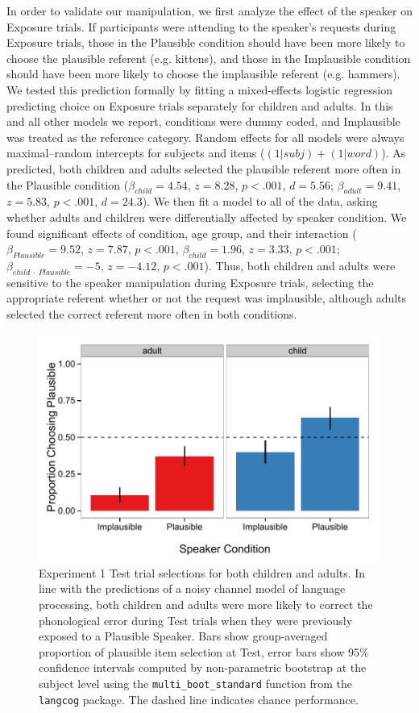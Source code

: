 \documentclass[man,floatsintext]{apa6}
\begin{document}
In order to validate our manipulation, we first analyze the effect of the speaker on Exposure trials. If participants were attending to the speaker's requests during Exposure trials, those in the Plausible condition should have been more likely to choose the plausible referent (e.g. kittens), and those in the Implausible condition should have been more likely to choose the implausible referent (e.g. hammers). We tested this prediction formally by fitting a mixed-effects logistic regression predicting choice on Exposure trials separately for children and adults. In this and all other models we report, conditions were dummy coded, and Implausible was treated as the reference category. Random effects for all models were always maximal--random intercepts for subjects and items ($(1|subj) + (1|word)$). As predicted, both children and adults selected the plausible referent more often in the Plausible condition ($\beta_{child} = 4.54$,  $z = 8.28$, $p <.001$, $d = 5.56$; $\beta_{adult} = 9.41$,  $z = 5.83$, $p <.001$, $d = 24.3$). We then fit a model to all of the data, asking whether adults and children were differentially affected by speaker condition. We found significant effects of condition, age group, and their interaction ($\beta_{Plausible} = 9.52$,  $z = 7.87$, $p <.001$,  $\beta_{child} = 1.96$,  $z = 3.33$, $p <.001$; $\beta_{child\: \cdot \: Plausible} = -5$,  $z = -4.12$, $p <.001$). Thus, both children and adults were sensitive to the speaker manipulation during Exposure trials, selecting the appropriate referent whether or not the request was implausible, although adults selected the correct referent more often in both conditions.

\begin{figure}[tb]
\centering
     \includegraphics[width=5in]{figures/exp1_results.pdf}
    \caption{Experiment 1 Test trial selections for both children and adults. In line with the predictions of a noisy channel model of language processing, both children and adults were more likely to correct the phonological error during Test trials when they were previously exposed to a Plausible Speaker. Bars show group-averaged proportion of plausible item selection at Test, error bars show 95\% confidence intervals computed by non-parametric bootstrap at the subject level using the {\small \tt{multi\_boot\_standard}} function from the {\small \tt{langcog}} package. The dashed line indicates chance performance.}%
   \label{fig:exp1_results}
\end{figure}
\end{document}
